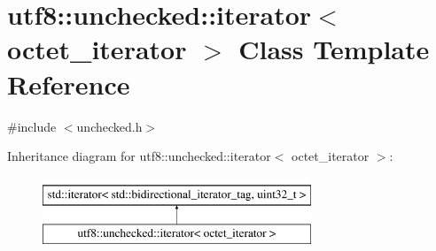 \hypertarget{classutf8_1_1unchecked_1_1iterator}{}\section{utf8\+:\+:unchecked\+:\+:iterator$<$ octet\+\_\+iterator $>$ Class Template Reference}
\label{classutf8_1_1unchecked_1_1iterator}


{\ttfamily \#include $<$unchecked.\+h$>$}

Inheritance diagram for utf8\+:\+:unchecked\+:\+:iterator$<$ octet\+\_\+iterator $>$\+:\begin{figure}[H]
\begin{center}
\leavevmode
\includegraphics[height=2.000000cm]{classutf8_1_1unchecked_1_1iterator}
\end{center}
\end{figure}
